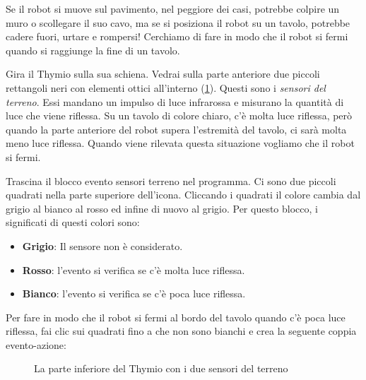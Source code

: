 
Se il robot si muove sul pavimento, nel peggiore dei casi, potrebbe colpire un muro o scollegare il
suo cavo, ma se si posiziona il robot su un tavolo, potrebbe cadere
fuori, urtare e rompersi! Cerchiamo di fare in modo che il robot si fermi quando si
raggiunge la fine di un tavolo.


Gira il Thymio sulla sua schiena. Vedrai sulla parte anteriore due piccoli
rettangoli neri con elementi ottici all'interno (\cref{fig.bottom}).
Questi sono i \emph{sensori del terreno}.
Essi mandano un impulso di luce infrarossa e misurano la quantità di luce che viene riflessa.
Su un tavolo di colore chiaro, c'è molta luce riflessa, però quando la parte anteriore del robot supera l'estremità del tavolo, ci sarà molta meno luce riflessa. Quando viene
rilevata questa situazione vogliamo che il robot si fermi.


Trascina il blocco evento sensori terreno  nel programma. Ci
sono due piccoli quadrati nella parte superiore dell'icona. Cliccando i quadrati
il colore cambia dal grigio al bianco al rosso ed infine di nuovo al grigio.
Per questo blocco, i significati di questi colori sono:

\begin{itemize}
\item \textbf{Grigio}: Il sensore non è considerato.
\item \textbf{Rosso}: l'evento si verifica se c'è molta luce riflessa.
\item \textbf{Bianco}: l'evento si verifica se c'è poca luce riflessa.
\end{itemize}


Per fare in modo che il robot si fermi al bordo del tavolo quando c'è poca luce riflessa, fai clic sui quadrati fino a che non sono bianchi e crea la seguente coppia evento-azione:

\begin{figure}
\begin{center}
\caption{La parte inferiore del Thymio con i due sensori del terreno}\label{fig.bottom}
\end{center}
\end{figure}

